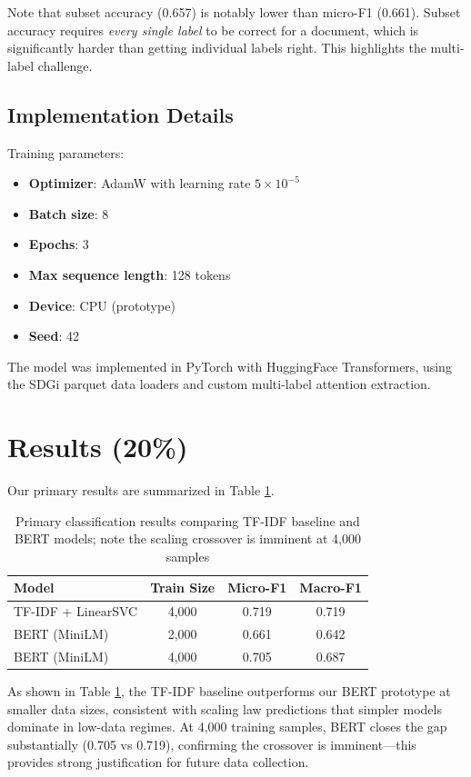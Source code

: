 \documentclass[12pt,a4paper]{article}
\begin{document}
Note that subset accuracy (0.657) is notably lower than micro-F1 (0.661). Subset accuracy requires \textit{every single label} to be correct for a document, which is significantly harder than getting individual labels right. This highlights the multi-label challenge.

\subsection{Implementation Details}

Training parameters:
\begin{itemize}
    \item \textbf{Optimizer}: AdamW with learning rate $5 \times 10^{-5}$
    \item \textbf{Batch size}: 8
    \item \textbf{Epochs}: 3
    \item \textbf{Max sequence length}: 128 tokens
    \item \textbf{Device}: CPU (prototype)
    \item \textbf{Seed}: 42
\end{itemize}

The model was implemented in PyTorch with HuggingFace Transformers, using the SDGi parquet data loaders and custom multi-label attention extraction.

\section{Results (20\%)}

Our primary results are summarized in Table \ref{tab:results}.

\begin{table}[htbp]
\caption{Primary classification results comparing TF-IDF baseline and BERT models; note the scaling crossover is imminent at 4,000 samples}
\label{tab:results}
\centering
\begin{tabular}{lccc}
\toprule
Model & Train Size & Micro-F1 & Macro-F1 \\
\midrule
TF-IDF + LinearSVC & 4,000 & 0.719 & 0.719 \\
BERT (MiniLM) & 2,000 & 0.661 & 0.642 \\
BERT (MiniLM) & 4,000 & 0.705 & 0.687 \\
\bottomrule
\end{tabular}
\end{table}

As shown in Table \ref{tab:results}, the TF-IDF baseline outperforms our BERT prototype at smaller data sizes, consistent with scaling law predictions that simpler models dominate in low-data regimes. At 4,000 training samples, BERT closes the gap substantially (0.705 vs 0.719), confirming the crossover is imminent—this provides strong justification for future data collection.
\end{document}
